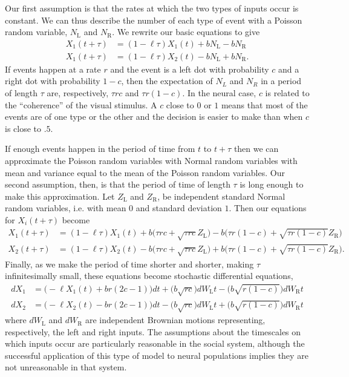 \documentclass{article}
\begin{document}
Our first assumption is that the rates at which the two types of inputs occur is constant.  We can thus describe the number of each type of event with a Poisson random variable, $N_\text{L}$ and $N_\text{R}$.  We rewrite our basic equations to give 
\begin{align*}
X_1(t+\tau)&=(1-\ell\tau)X_1(t)+bN_\text{L}-bN_\text{R}
\\ X_1(t+\tau)&=(1-\ell\tau)X_2(t)-bN_\text{L}+bN_\text{R}.
\end{align*}
If events happen at a rate $r$ and the event is a left dot with probability $c$ and a right dot with probability $1-c$, then the expectation of $N_L$ and $N_R$ in a period of length $\tau$ are, respectively, $\tau r c$ and $\tau r(1-c)$. In the neural case, $c$ is related to the ``coherence'' of the visual stimulus.  A $c$ close to $0$ or $1$ means that most of the events are of one type or the other and the decision is easier to make than when $c$ is close to $.5$.

If enough events happen in the period of time from $t$ to $t+\tau$ then we can approximate the Poisson random variables with Normal random variables with mean and variance equal to the mean of the Poisson random variables.  Our second assumption, then, is that the period of time of length $\tau$ is long enough to make this approximation. Let $Z_\text{L}$ and $Z_\text{R}$, be independent standard Normal random variables, i.e. with mean $0$ and standard deviation $1$.  Then our equations for $X_i(t+\tau)$ become
\begin{align*}
X_1(t+\tau)&=(1-\ell\tau)X_1(t)+b\bigg(\tau rc+\sqrt{\tau rc}Z_{\text{L}}\bigg)-b\bigg(\tau r(1-c)+\sqrt{\tau r(1-c)}Z_{\text{R}}\bigg)
\\X_2(t+\tau)&=(1-\ell\tau)X_2(t)-b\bigg(\tau rc+\sqrt{\tau rc}Z_{\text{L}}\bigg)+b\bigg(\tau r(1-c)+\sqrt{\tau r(1-c)}Z_{\text{R}}\bigg).
\end{align*}
Finally, as we make the period of time shorter and shorter, making $\tau$ infinitesimally small, these equations become stochastic differential equations,
\begin{equation}
\begin{array}{ll}
dX_1&=\bigg(-\ell X_1(t)+br(2c-1)\bigg)dt+\bigg(b\sqrt{rc}\bigg)dW_\text{L}t-\bigg(b\sqrt{r(1-c)}\bigg)dW_\text{R}t
\\dX_2&=\bigg(-\ell X_2(t)-br(2c-1)\bigg)dt-\bigg(b\sqrt{rc}\bigg)dW_\text{L}t+\bigg(b\sqrt{r(1-c)}\bigg)dW_\text{R}t
\end{array}
\end{equation}
where $dW_{\text{L}}$ and $dW_{\text{R}}$ are independent Brownian motions representing, respectively, the left and right inputs.  The assumptions about the timescales on which inputs occur are particularly reasonable in the social system, although the successful application of this type of model to neural populations implies they are not unreasonable in that system.
\end{document}
